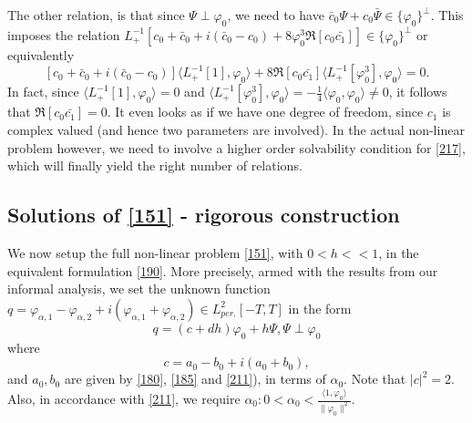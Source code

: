 \documentclass[12pt]{amsart}
\theoremstyle{definition}
\theoremstyle{remark}
\numberwithin{equation}{section}
\renewcommand{\(}{\left(}
\renewcommand{\)}{\right)}
\renewcommand{\[}{\left[}
\renewcommand{\]}{\right]}
\newcommand{\f}[2]{\frac{#1}{#2}}
\newcommand{\al}{\alpha}
\newcommand{\vp}{\varphi}
\newcommand{\dpr}[2]{\langle #1,#2 \rangle}
\begin{document}
 The other relation, is that since $\Psi\perp \vp_0$, we need to have $\bar{c}_0\Psi+c_0\bar{\Psi}\in \{\vp_0\}^\perp$.
 This  imposes the relation $L_+^{-1}[c_0+\bar{c}_0+i(\bar{c}_0-c_0)+8 \vp_0^3  \Re[c_0\bar{c_1}]] \in \{\vp_0\}^\perp$ or equivalently
 $$
 [c_0+\bar{c}_0+i(\bar{c}_0-c_0)] \dpr{ L_+^{-1}[1]}{\vp_0}+8  \Re[c_0\bar{c_1}]\dpr{L_+^{-1}[\vp_0^3]}{\vp_0}=0.
 $$
 In fact, since $\dpr{ L_+^{-1}[1]}{\vp_0}=0$ and $\dpr{L_+^{-1}[\vp_0^3]}{\vp_0}=-\f{1}{4} \dpr{\vp_0}{\vp_0}\neq 0$, it follows that $\Re[c_0\bar{c_1}]=0$.
   It even looks as if we have one degree of  freedom, since $c_1$ is complex valued (and hence two parameters are involved). In the actual non-linear problem however, we need to involve a higher order solvability condition for \eqref{217}, which will finally yield the right number of relations.

 \subsection{Solutions of \eqref{151} - rigorous construction}
 We now setup the full non-linear problem \eqref{151}, with $0<h<<1$, in the equivalent formulation \eqref{190}. More precisely, armed with the results from our informal analysis, we  set the unknown function \\  $q=\vp_{\al,1}-\vp_{\al,2}+i(\vp_{\al,1}+\vp_{\al,2}) \in L^2_{per.}[-T,T]$ in the form
 $$
 q=(c+d h)\vp_0+ h \Psi, \Psi\perp \vp_0
 $$
 where
 $$
 c=a_0-b_0+i(a_0+b_0),
 $$
  and $a_0, b_0$ are given by \eqref{180}, \eqref{185} and \eqref{211}), in terms of $\al_0$. Note that $|c|^2=2$. Also, in accordance with \eqref{211}, we require $\al_0: 0<\al_0 < \f{\dpr{1}{\vp_0}}{\|\vp_0\|^2}$.
\end{document}
